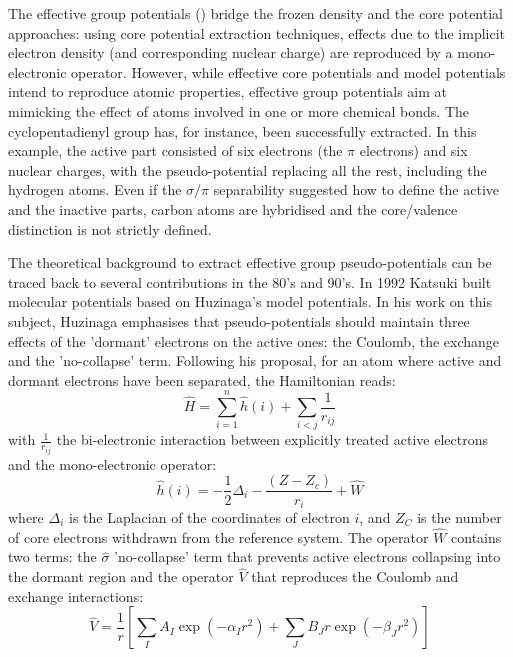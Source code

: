\documentclass[aip,reprint]{revtex4-1}
\begin{document}
The effective group potentials (\showCustomItem) bridge the frozen density and the core potential
approaches: using core potential extraction techniques, effects due to the implicit 
electron density (and corresponding nuclear charge) 
are reproduced by a mono-electronic operator.\cite{carissan_what_2006, raynaud_multicentered_2010}
However, while effective core potentials and model potentials intend to 
reproduce atomic properties,
effective group potentials aim at mimicking the effect of atoms involved in one or more chemical
bonds. The cyclopentadienyl group has, for instance, been successfully extracted.\cite{carissan_what_2006}
In this example, the active part consisted of six electrons (the $\pi$ electrons) and six
nuclear charges, with the pseudo-potential replacing all the rest, including the hydrogen atoms.
Even if the $\sigma / \pi$ separability suggested how to define the active and the inactive parts,
carbon atoms are hybridised and the core/valence distinction is not 
strictly defined.

The theoretical background to extract effective group pseudo-potentials  can be traced back 
to several contributions in the 80's and  90's.\cite{Nicolas1980a, huzinaga_effective_1991, huzinaga_1994_1995, EGP5, EGP6, EGP9}
In 1992 Katsuki built molecular potentials based on Huzinaga's model potentials.\cite{katsuki_molecular_1992,katsuki_spectral_1993}
 In his work on this subject, Huzinaga emphasises that pseudo-potentials should maintain three effects of the
'dormant' electrons on the active ones: the Coulomb, the exchange and the 'no-collapse' term.\cite{huzinaga_effective_1991}
Following his proposal, for an atom where active and dormant electrons have been separated, the Hamiltonian reads:
\begin{equation}
\label{eq:atomicHamiltonian}
\hat{H} = \sum_{i=1}^n \hat{h}(i) +\sum_{i<j}\frac{1}{r_{ij}}
\end{equation}
with $\frac{1}{r_{ij}}$ the bi-electronic interaction
between explicitly treated active electrons and
the mono-electronic operator:
\begin{equation}
\label{eq:monoElectronicOperator}
\hat{h}(i) = -\frac{1}{2}\Delta_i - \frac{(Z-Z_c)}{r_i} + \hat{W}
\end{equation}
where $\Delta_i$ is the Laplacian of the coordinates of electron $i$, and 
$Z_C$ is the number of core electrons withdrawn from the reference system.
The operator $\hat{W}$ contains two terms: the 
$\hat{\sigma}$  'no-collapse' term that prevents active electrons
collapsing into the dormant region and the operator $\hat{V}$ that reproduces the 
Coulomb and exchange interactions:
\begin{equation}
\label{eq:HuzinagaMPVersion1Potential}
\hat{V} = \frac{1}{r}\left[\sum_IA_I\exp(-\alpha_I r^2)+\sum_JB_Jr\exp(-\beta_J r^2)\right]
\end{equation}
\end{document}
